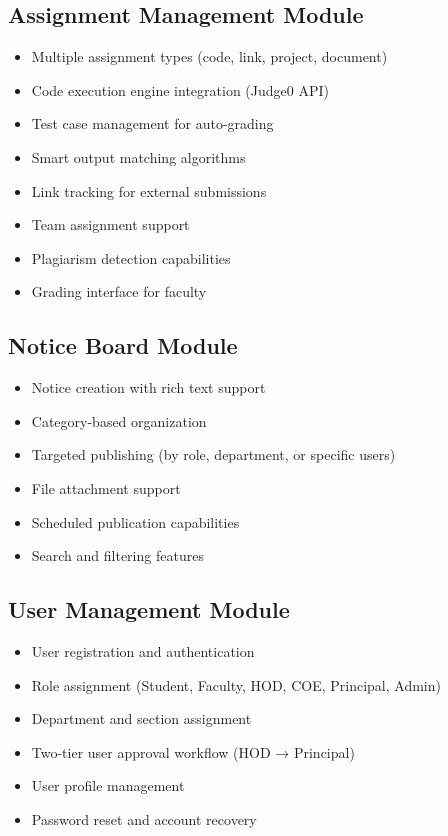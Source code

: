 \subsection{Assignment Management Module}
\begin{itemize}[itemsep=3pt]
\item Multiple assignment types (code, link, project, document)
\item Code execution engine integration (Judge0 API)
\item Test case management for auto-grading
\item Smart output matching algorithms
\item Link tracking for external submissions
\item Team assignment support
\item Plagiarism detection capabilities
\item Grading interface for faculty
\end{itemize}

\subsection{Notice Board Module}
\begin{itemize}[itemsep=3pt]
\item Notice creation with rich text support
\item Category-based organization
\item Targeted publishing (by role, department, or specific users)
\item File attachment support
\item Scheduled publication capabilities
\item Search and filtering features
\end{itemize}

\subsection{User Management Module}
\begin{itemize}[itemsep=3pt]
\item User registration and authentication
\item Role assignment (Student, Faculty, HOD, COE, Principal, Admin)
\item Department and section assignment
\item Two-tier user approval workflow (HOD → Principal)
\item User profile management
\item Password reset and account recovery
\end{itemize}

